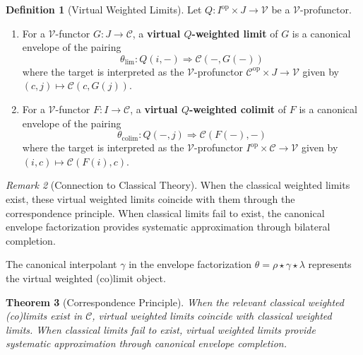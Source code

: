 \documentclass[11pt]{article}
\theoremstyle{plain}
\newtheorem{theorem}{Theorem}[section]
\theoremstyle{definition}
\newtheorem{definition}[theorem]{Definition}
\theoremstyle{remark}
\newtheorem{remark}[theorem]{Remark}
\newcommand{\V}{\mathcal{V}}
\newcommand{\C}{\mathcal{C}}
\newcommand{\op}{\mathrm{op}}
\newcommand{\colim}{\mathrm{colim}}
\renewcommand{\lim}{\mathrm{lim}}
\begin{document}
\begin{definition}[Virtual Weighted Limits]
Let $Q : I^{\op} \times J \to \V$ be a $\V$-profunctor.

\begin{enumerate}
\item For a $\V$-functor $G : J \to \C$, a \textbf{virtual $Q$-weighted limit} of $G$ is a canonical envelope of the pairing
\[
\theta_{\lim} : Q(i, -) \Rightarrow \C(-, G(-))
\]
where the target is interpreted as the $\V$-profunctor $\C^{\op} \times J \to \V$ given by $(c,j) \mapsto \C(c, G(j))$.

\item For a $\V$-functor $F : I \to \C$, a \textbf{virtual $Q$-weighted colimit} of $F$ is a canonical envelope of the pairing  
\[
\theta_{\colim} : Q(-, j) \Rightarrow \C(F(-), -)
\]
where the target is interpreted as the $\V$-profunctor $I^{\op} \times \C \to \V$ given by $(i,c) \mapsto \C(F(i), c)$.
\end{enumerate}
\end{definition}

\begin{remark}[Connection to Classical Theory]
When the classical weighted limits exist, these virtual weighted limits coincide with them through the correspondence principle. When classical limits fail to exist, the canonical envelope factorization provides systematic approximation through bilateral completion.

The canonical interpolant $\gamma$ in the envelope factorization $\theta = \rho \star \gamma \star \lambda$ represents the virtual weighted (co)limit object.
\end{remark}

\begin{theorem}[Correspondence Principle]
When the relevant classical weighted (co)limits exist in $\C$, virtual weighted limits coincide with classical weighted limits. When classical limits fail to exist, virtual weighted limits provide systematic approximation through canonical envelope completion.
\end{theorem}
\end{document}

